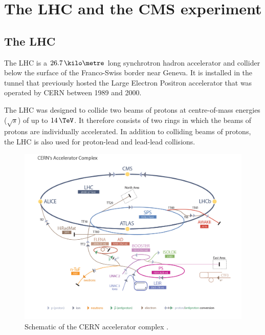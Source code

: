 \chapter{The \acs{LHC} and the \acs{CMS} experiment}
\label{chap:CMSLHC}

\section{The \acs{LHC}}
\label{sec:CMSLHC_LHC}

The \acf{LHC} \cite{lhc-machine}  is a $26.7\,\kilo\metre$ long synchrotron hadron accelerator and collider below the surface of the 
Franco-Swiss border near Geneva. It
is installed in the tunnel that previously hosted the Large Electron Positron accelerator \cite{lep-design}
that was operated by \acf{CERN} between 1989 and 2000.

The \ac{LHC} was designed to collide two beams of protons %
at centre-of-mass
energies ($\sqrt{s}$) of up to $14\,\TeV$. It therefore consists of two rings in which the beams
of protons are individually accelerated. In addition to colliding beams of protons, the \ac{LHC}
is also used for proton-lead and lead-lead collisions.
\begin{figure}[h!]
\includegraphics[width=\textwidth]{./Detector/Plots/LHC_default.jpg}
\caption[Schematic of the CERN accelerator complex.]{Schematic of the \ac{CERN} accelerator complex \cite{lhc-schematic}.}
\label{fig:lhc_schematic}
\end{figure}


